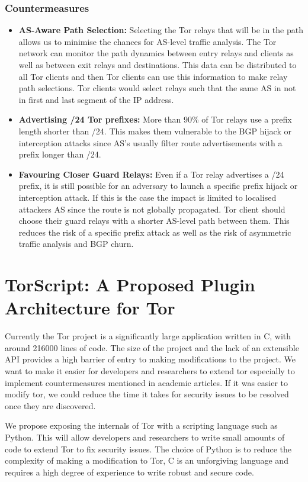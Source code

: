 \documentclass[9pt,technote]{IEEEtran}
\begin{document}
\subsubsection{Countermeasures}
\begin{itemize}
\item \textbf{AS-Aware Path Selection:} Selecting the Tor relays that will be in
	the path allows us to minimise the chances for AS-level traffic
	analysis. The Tor network can monitor the path dynamics between entry
	relays and clients as well as between exit relays and destinations. This
	data can be distributed to all Tor clients and then Tor clients can use
	this information to make relay path selections. Tor clients would select
	relays such that the same AS in not in first and last segment of the IP
	address.
\item \textbf{Advertising /24 Tor prefixes:} More than 90\% of Tor relays use a
	prefix length shorter than /24. This makes them vulnerable to the BGP
	hijack or interception attacks since AS's usually filter route
	advertisements with a prefix longer than /24.
\item \textbf{Favouring Closer Guard Relays:} Even if a Tor relay advertises a
	/24 prefix, it is still possible for an adversary to launch a specific
	prefix hijack or interception attack. If this is the case the impact is
	limited to localised attackers AS since the route is not globally
	propagated. Tor client should choose their guard relays with a shorter
	AS-level path between them. This reduces the risk of a specific prefix
	attack as well as the risk of asymmetric traffic analysis and BGP churn.
\end{itemize}

\section{TorScript: A Proposed Plugin Architecture for Tor}
Currently the Tor project is a significantly large application written in C,
with around 216000 lines of code. The size of the project and the lack of an
extensible API provides a high barrier of entry to making modifications to the
project. We want to make it easier for developers and researchers to extend tor
especially to implement countermeasures mentioned in academic articles. If it
was easier to modify tor, we could reduce the time it takes for security issues
to be resolved once they are discovered.

We propose exposing the internals of Tor with a scripting language such as
Python. This will allow developers and researchers to write small amounts of
code to extend Tor to fix security issues. The choice of Python is to reduce the
complexity of making a modification to Tor, C is an unforgiving language and
requires a high degree of experience to write robust and secure code.
\end{document}
